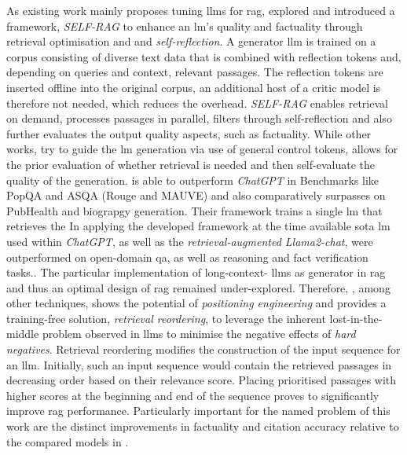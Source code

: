 %
As existing work mainly proposes tuning \ac{llm}s for \ac{rag}, \citet{Asai2023SelfRAGLT} explored and introduced a framework, \textit{SELF-RAG} to enhance an \ac{lm}'s quality and factuality through retrieval optimisation and and \textit{self-reflection}.
A generator \ac{llm} is trained on a corpus consisting of diverse text data that is combined with reflection tokens and, depending on queries and context, relevant passages. 
The reflection tokens are inserted offline into the original corpus, an additional host of a critic model is therefore not needed, which reduces the overhead.
\textit{SELF-RAG} enables retrieval on demand, processes passages in parallel, filters through self-reflection and also further evaluates the output quality aspects, such as factuality.
While other works, \citet{lu2022QuarkCT, Korbak2023PretrainingLM} try to guide the \ac{lm} generation via use of general control tokens, \citet{Asai2023SelfRAGLT}  allows for the prior evaluation of whether retrieval is needed and then self-evaluate the quality of the generation.
\citet{Asai2023SelfRAGLT} is able to outperform \textit{ChatGPT} in Benchmarks like PopQA and ASQA (Rouge and MAUVE) and also comparatively surpasses on PubHealth and biograpgy generation.
Their framework trains a single \ac{lm} that retrieves the 
In applying the developed framework at the time available \ac{sota} \ac{lm} used within \textit{ChatGPT}, as well as the \textit{retrieval-augmented Llama2-chat}, were outperformed on open-domain \ac{qa}, as well as reasoning and fact verification tasks.\citep{jin2024longcontextllmsmeetrag}.
%
The particular implementation of long-context- \ac{llm}s as generator in \ac{rag} and thus an optimal design of \ac{rag} remained under-explored.\citep{jin2024longcontextllmsmeetrag}
%
Therefore, \citet{jin2024longcontextllmsmeetrag}, among other techniques, shows the potential of \textit{positioning engineering} and provides a training-free solution, \textit{retrieval reordering}, to leverage the inherent lost-in-the-middle problem observed in \ac{llm}s to minimise the negative effects of \textit{hard negatives}.
Retrieval reordering modifies the construction of the input sequence for an \ac{llm}.
Initially, such an input sequence would contain the retrieved passages in decreasing order based on their relevance score.
Placing prioritised passages with higher scores at the beginning and end of the sequence proves to significantly improve \ac{rag} performance.\citep{jin2024longcontextllmsmeetrag}
%
Particularly important for the named problem of this work are the distinct improvements in factuality and citation accuracy relative to the compared models in \citet{jin2024longcontextllmsmeetrag}.
